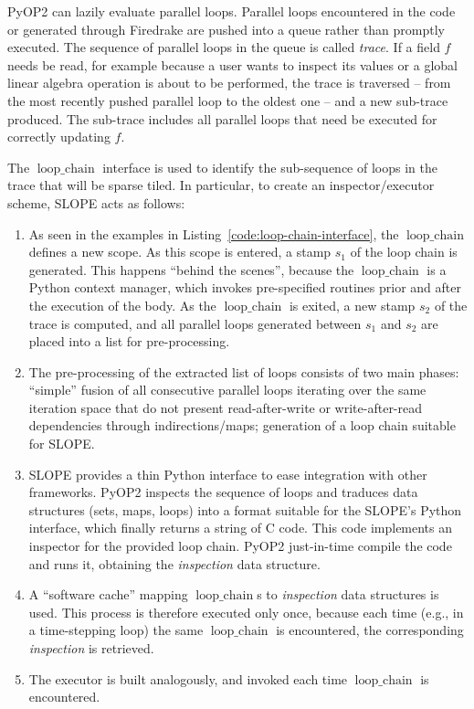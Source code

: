 PyOP2 can lazily evaluate parallel loops. Parallel loops encountered in the code or generated through Firedrake are pushed into a queue rather than promptly executed. The sequence of parallel loops in the queue is called {\em trace}. If a field $f$ needs be read, for example because a user wants to inspect its values or a global linear algebra operation is about to be performed, the trace is traversed -- from the most recently pushed parallel loop to the oldest one -- and a new sub-trace produced. The sub-trace includes all parallel loops that need be executed for correctly updating $f$. 

The $\operatorname{loop\_chain}$ interface is used to identify the sub-sequence of loops in the trace that will be sparse tiled. In particular, to create an inspector/executor scheme, SLOPE acts as follows:
\begin{enumerate}
\item As seen in the examples in Listing~\ref{code:loop-chain-interface}, the $\operatorname{loop\_chain}$ defines a new scope. As this scope is entered, a stamp $s_1$ of the loop chain is generated. This happens ``behind the scenes'', because the $\operatorname{loop\_chain}$ is a Python context manager, which invokes pre-specified routines prior and after the execution of the body. As the $\operatorname{loop\_chain}$ is exited, a new stamp $s_2$ of the trace is computed, and all parallel loops generated between $s_1$ and $s_2$ are placed into a list for pre-processing.
\item The pre-processing of the extracted list of loops consists of two main phases: ``simple'' fusion of all consecutive parallel loops iterating over the same iteration space that do not present read-after-write or write-after-read dependencies through indirections/maps; generation of a loop chain suitable for SLOPE.
\item SLOPE provides a thin Python interface to ease integration with other frameworks. PyOP2 inspects the sequence of loops and traduces data structures (sets, maps, loops) into a format suitable for the SLOPE's Python interface, which finally returns a string of C code. This code implements an inspector for the provided loop chain. PyOP2 just-in-time compile the code and runs it, obtaining the {\em inspection} data structure.
\item A ``software cache'' mapping $\operatorname{loop\_chain}$s to {\em inspection} data structures is used. This process is therefore executed only once, because each time (e.g., in a time-stepping loop) the same $\operatorname{loop\_chain}$ is encountered, the corresponding {\em inspection} is retrieved.
\item The executor is built analogously, and invoked each time $\operatorname{loop\_chain}$ is encountered.
\end{enumerate}


